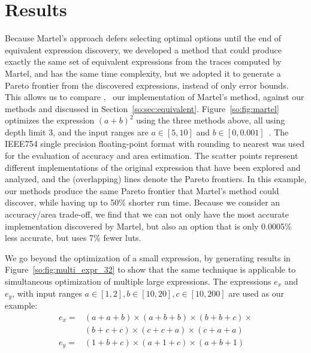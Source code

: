 \section{Results}
\label{so:sec:results}

Because Martel's approach defers selecting optimal options until the end of
equivalent expression discovery, we developed a method that could produce
exactly the same set of equivalent expressions from the traces computed by
Martel, and has the same time complexity, but we adopted it to generate
a Pareto frontier from the discovered expressions, instead of only error
bounds.  This allows us to compare \marteltrace{}, \ie~our implementation
of Martel's method, against our methods \frontiertrace{} and \greedytrace{}
discussed in Section~\ref{so:sec:equivalent}.  Figure~\ref{so:fig:martel}
optimizes the expression ${(a + b)}^2$ using the three methods above, all
using depth limit $3$, and the input ranges are $a \in [5, 10]$ and $b \in [0,
0.001]$~\cite{martel07}. The IEEE754 single precision floating-point format
with rounding to nearest was used for the evaluation of accuracy and area
estimation. The scatter points represent different implementations of the
original expression that have been explored and analyzed, and the (overlapping)
lines denote the Pareto frontiers. In this example, our methods produce the
same Pareto frontier that Martel's method could discover, while having up to
50\% shorter run time. Because we consider an accuracy/area trade-off, we
find that we can not only have the most accurate implementation discovered by
Martel, but also an option that is only 0.0005\% less accurate, but uses 7\%
fewer \glspl{lut}.

We go beyond the optimization of a small expression, by generating results in
Figure~\ref{so:fig:multi_expr_32} to show that the same technique is applicable
to simultaneous optimization of multiple large expressions. The expressions
$e_x$ and $e_y$, with input ranges $a \in [1, 2], b \in [10, 20], c \in [10,
200]$ are used as our example:
\begin{equation}
    \begin{aligned}
    e_x =& (a + a + b) \times (a + b + b) \times (b + b + c) \times {} \\
         & (b + c + c) \times (c + c + a) \times (c + a + a) \\
    e_y =& (1 + b + c) \times (a + 1 + c) \times (a + b + 1)
    \end{aligned}
\end{equation}


